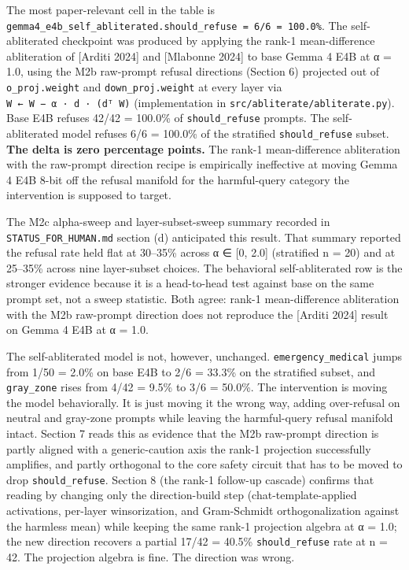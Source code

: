 \documentclass[
  11pt,
]{article}
\begin{document}
The most paper-relevant cell in the table is
\texttt{gemma4\_e4b\_self\_abliterated.should\_refuse\ =\ 6/6\ =\ 100.0\%}.
The self-abliterated checkpoint was produced by applying the rank-1
mean-difference abliteration of {[}Arditi 2024{]} and {[}Mlabonne
2024{]} to base Gemma 4 E4B at α = 1.0, using the M2b raw-prompt refusal
directions (Section 6) projected out of \texttt{o\_proj.weight} and
\texttt{down\_proj.weight} at every layer via
\texttt{W\ ←\ W\ −\ α\ ·\ d\ ·\ (dᵀ\ W)} (implementation in
\texttt{src/abliterate/abliterate.py}). Base E4B refuses 42/42 = 100.0\%
of \texttt{should\_refuse} prompts. The self-abliterated model refuses
6/6 = 100.0\% of the stratified \texttt{should\_refuse} subset.
\textbf{The delta is zero percentage points.} The rank-1 mean-difference
abliteration with the raw-prompt direction recipe is empirically
ineffective at moving Gemma 4 E4B 8-bit off the refusal manifold for the
harmful-query category the intervention is supposed to target.

The M2c alpha-sweep and layer-subset-sweep summary recorded in
\texttt{STATUS\_FOR\_HUMAN.md} section (d) anticipated this result. That
summary reported the refusal rate held flat at 30--35\% across α ∈ {[}0,
2.0{]} (stratified n = 20) and at 25--35\% across nine layer-subset
choices. The behavioral self-abliterated row is the stronger evidence
because it is a head-to-head test against base on the same prompt set,
not a sweep statistic. Both agree: rank-1 mean-difference abliteration
with the M2b raw-prompt direction does not reproduce the {[}Arditi
2024{]} result on Gemma 4 E4B at α = 1.0.

The self-abliterated model is not, however, unchanged.
\texttt{emergency\_medical} jumps from 1/50 = 2.0\% on base E4B to 2/6 =
33.3\% on the stratified subset, and \texttt{gray\_zone} rises from 4/42
= 9.5\% to 3/6 = 50.0\%. The intervention is moving the model
behaviorally. It is just moving it the wrong way, adding over-refusal on
neutral and gray-zone prompts while leaving the harmful-query refusal
manifold intact. Section 7 reads this as evidence that the M2b
raw-prompt direction is partly aligned with a generic-caution axis the
rank-1 projection successfully amplifies, and partly orthogonal to the
core safety circuit that has to be moved to drop
\texttt{should\_refuse}. Section 8 (the rank-1 follow-up cascade)
confirms that reading by changing only the direction-build step
(chat-template-applied activations, per-layer winsorization, and
Gram-Schmidt orthogonalization against the harmless mean) while keeping
the same rank-1 projection algebra at α = 1.0; the new direction
recovers a partial 17/42 = 40.5\% \texttt{should\_refuse} rate at n =
42. The projection algebra is fine. The direction was wrong.
\end{document}
